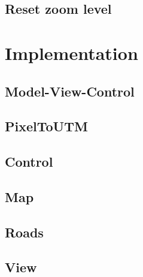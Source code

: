 \documentclass[11pt,a4paper,titlepage]{article}
\begin{document}
\subsection{Reset zoom level}

\section{Implementation}

\subsection{Model-View-Control}
\subsection{PixelToUTM}
\subsection{Control}
\subsection{Map}
\subsection{Roads}
\subsection{View}
\end{document}
